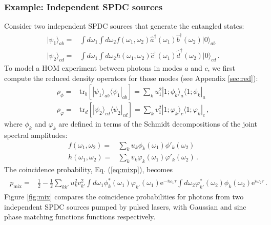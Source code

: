 \documentclass[12pt]{article}
\newcommand{\ket}[2] {| #1 \rangle_{#2}}
\newcommand{\bra}[2] {\langle #1 |_{#2}}
\newcommand{\dg}{^{\dagger}}
\newcommand{\ee}[1] {\mathrm{e}^{#1}}
\begin{document}
\subsubsection{Example: Independent SPDC sources}

Consider two independent SPDC sources that generate the entangled states:
\begin{align}
\ket{\psi_1}{ab}={}&\int d\omega_1\int d\omega_2f(\omega_1,\omega_2)\hat{a}\dg(\omega_1)\hat{b}\dg(\omega_2)\ket{0}{ab}\\
\ket{\psi_2}{cd}={}&\int d\omega_1\int d\omega_2h(\omega_1,\omega_2)\hat{c}\dg(\omega_1)\hat{d}\dg(\omega_2)\ket{0}{cd}\,.
\end{align}
To model a HOM experiment between photons in modes $a$ and $c$, we first compute the reduced density operators for those modes (see Appendix \ref{sec:red}):
\begin{align}
\rho_{\phi}={}&\mathrm{tr}_{b}\left[\ket{\psi_1}{ab}\bra{\psi_1}{ab}\right]=\sum_{k}u_1^2\ket{1;\phi_k}{a}\bra{1;\phi_{k}}{a}\\
\rho_{\varphi}={}&\mathrm{tr}_{d}\left[\ket{\psi_2}{cd}\bra{\psi_2}{cd}\right]=\sum_{k}v_1^2\ket{1;\varphi_k}{c}\bra{1;\varphi_{k}}{c}\,,
\end{align}
where $\phi_k$ and $\varphi_k$ are defined in terms of the Schmidt decompositions of the joint spectral amplitudes:
\begin{align}
f(\omega_1,\omega_2)={}&\sum_{k}u_k \phi_k(\omega_1)\phi'_k(\omega_2)\\
h(\omega_1,\omega_2)={}&\sum_{k}v_k \varphi_k(\omega_1)\varphi'_k(\omega_2)\,.
\end{align}
The coincidence probability, Eq. (\ref{eq:mixp}), becomes
\begin{align}\label{eq:pmix}
\begin{split}
p_{\mathrm{mix}}={}&\frac{1}{2}-\frac{1}{2}\sum_{kk'}u^2_{k}v^2_{k'}\int d\omega_{1}\phi_{k}^*(\omega_{1})\varphi_{k'}(\omega_{1}) \ee{-i\omega_{1} \tau}\int d\omega_{2}\varphi_{k'}^*(\omega_{2}) \phi_{k}(\omega_{2}) \ee{i\omega_2 \tau}\,.
\end{split}
\end{align}
Figure \ref{fig:mix} compares the coincidence probabilities for photons from two independent SPDC sources pumped by pulsed lasers, with Gaussian and sinc phase matching functions functions respectively. 
\end{document}
